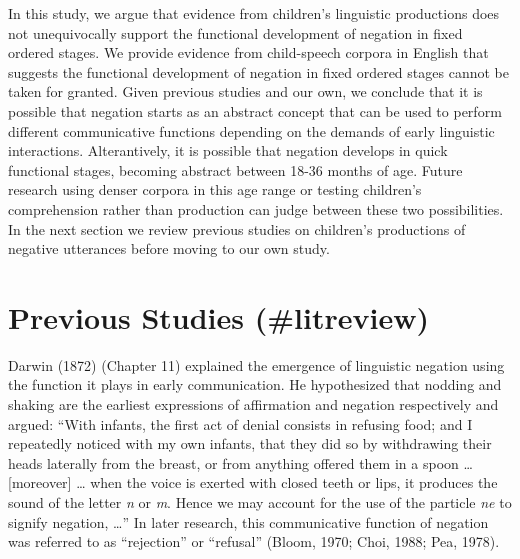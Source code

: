 \documentclass[
  english,
  man,floatsintext]{apa6}
\begin{document}
In this study, we argue that evidence from children's linguistic productions does not unequivocally support the functional development of negation in fixed ordered stages. We provide evidence from child-speech corpora in English that suggests the functional development of negation in fixed ordered stages cannot be taken for granted. Given previous studies and our own, we conclude that it is possible that negation starts as an abstract concept that can be used to perform different communicative functions depending on the demands of early linguistic interactions. Alterantively, it is possible that negation develops in quick functional stages, becoming abstract between 18-36 months of age. Future research using denser corpora in this age range or testing children's comprehension rather than production can judge between these two possibilities. In the next section we review previous studies on children's productions of negative utterances before moving to our own study.

\hypertarget{previous-studies-litreview}{%
\section{Previous Studies (\#litreview)}\label{previous-studies-litreview}}

Darwin (1872) (Chapter 11) explained the emergence of linguistic negation using the function it plays in early communication. He hypothesized that nodding and shaking are the earliest expressions of affirmation and negation respectively and argued: ``With infants, the first act of denial consists in refusing food; and I repeatedly noticed with my own infants, that they did so by withdrawing their heads laterally from the breast, or from anything offered them in a spoon \ldots{} {[}moreover{]} \ldots{} when the voice is exerted with closed teeth or lips, it produces the sound of the letter \emph{n} or \emph{m}. Hence we may account for the use of the particle \emph{ne} to signify negation, \ldots{}'' In later research, this communicative function of negation was referred to as ``rejection'' or ``refusal'' (Bloom, 1970; Choi, 1988; Pea, 1978).
\end{document}
